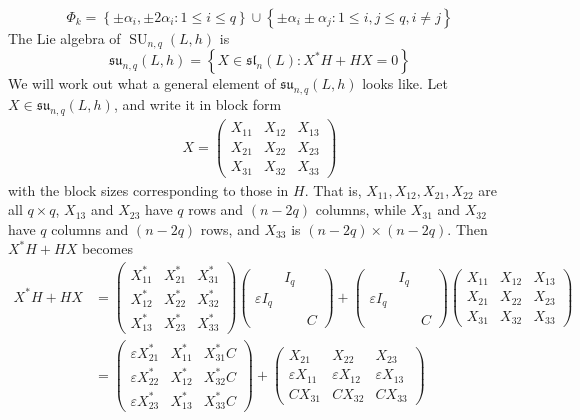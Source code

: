 \documentclass[12pt]{article}
\theoremstyle{definition}
\newcommand{\eps}{\varepsilon}
\newcommand{\lb}{\left\{}
\newcommand{\rb}{\right\}}
\newcommand{\fraksl}{\mathfrak{sl}}
\newcommand{\fraksu}{\mathfrak{su}}
\DeclareMathOperator{\SU}{SU}
\begin{document}
\[
	\Phi_k = \lb \pm \alpha_i, \pm 2 \alpha_i : 1 \le i \le q \rb \cup \lb \pm \alpha_i \pm \alpha_j : 1 \le i, j \le q, i \neq j \rb
\]
The Lie algebra of $\SU_{n,q}(L,h)$ is
\[
	\fraksu_{n,q}(L,h) = \lb X \in \fraksl_n(L) : X^* H + H X = 0 \rb
\]
We will work out what a general element of $\fraksu_{n,q}(L,h)$ looks like. Let $X \in \fraksu_{n,q}(L,h)$, and write it in block form
\begin{align*}
	X = \begin{pmatrix}
		X_{11} & X_{12} & X_{13} \\
		X_{21} & X_{22} & X_{23} \\
		X_{31} & X_{32} & X_{33}
		\end{pmatrix}
\end{align*}
with the block sizes corresponding to those in $H$. That is, $X_{11}, X_{12}, X_{21}, X_{22}$ are all $q \times q$, $X_{13}$ and $X_{23}$ have $q$ rows and $(n-2q)$ columns, while $X_{31}$ and $X_{32}$ have $q$ columns and $(n-2q)$ rows, and $X_{33}$ is $(n-2q) \times (n-2q)$. Then $X^* H + HX$ becomes
\begin{align*}
		X^* H + H X &=
		\begin{pmatrix}
			X_{11}^* & X_{21}^* & X_{31}^* \\
			X_{12}^* & X_{22}^* & X_{32}^* \\
			X_{13}^* & X_{23}^* & X_{33}^*
		\end{pmatrix}
		\begin{pmatrix}
		 	 & I_q &  \\
			\eps I_q &  & \\
			 &  & C
		\end{pmatrix}
		+
		\begin{pmatrix}
		 	 & I_q &  \\
			\eps I_q &  & \\
			 &  & C
		\end{pmatrix}
		\begin{pmatrix}
			 X_{11} &  X_{12} &  X_{13} \\
			 X_{21} &  X_{22} &  X_{23} \\
			 X_{31} &  X_{32} &  X_{33}
		\end{pmatrix} \\
		&=
		\begin{pmatrix}
			\eps X_{21}^* & X_{11}^* & X_{31}^* C \\
			\eps X_{22}^* & X_{12}^* & X_{32}^* C\\
			\eps X_{23}^* & X_{13}^* & X_{33}^* C 
		\end{pmatrix}
		+
		\begin{pmatrix}
			 X_{21} &  X_{22} &  X_{23} \\
		 	 \eps X_{11} &  \eps X_{12} &  \eps X_{13} \\
		 	C  X_{31} & C  X_{32} & C  X_{33}
		\end{pmatrix}
\end{align*}
\end{document}
